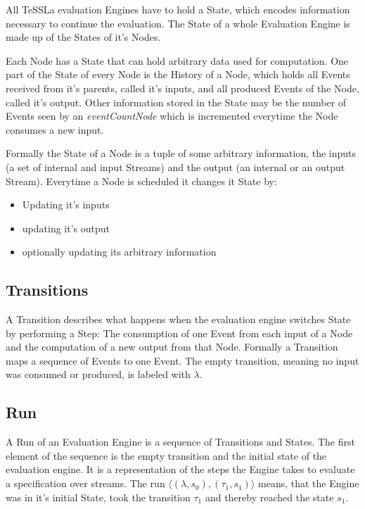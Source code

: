 All TeSSLa evaluation Engines have to hold a State, which encodes information necessary to continue the evaluation.
The State of a whole Evaluation Engine is made up of the States of it's Nodes.

Each Node has a State that can hold arbitrary data used for computation.
One part of the State of every Node is the History of a Node, which holds all Events received from it's parents, called it's inputs, and all produced Events of the Node, called it's output.
Other information stored in the State may be the number of Events seen by an \emph{eventCountNode} which is incremented everytime the Node consumes a new input.

Formally the State of a Node is a tuple of some arbitrary information, the inputs (a set of internal and input Streams) and the output (an internal or an output Stream).
Everytime a Node is scheduled it changes it State by:

\begin{itemize}
  \item Updating it's inputs
  \item updating it's output
  \item optionally updating its arbitrary information
\end{itemize}

\subsection{Transitions}
\label{sec:concepts:def:transitions}

A Transition describes what happens when the evaluation engine switches State by performing a Step:
The consumption of one Event from each input of a Node and the computation of a new output from that Node.
Formally a Transition maps a sequence of Events to one Event.
The empty transition, meaning no input was consumed or produced, is labeled with \(\lambda\).

\subsection{Run}
\label{sec:concepts:def:run}

A Run of an Evaluation Engine is a sequence of Transitions and States.
The first element of the sequence is the empty transition and the initial state of the evaluation engine.
It is a representation of the steps the Engine takes to evaluate a specification over streams.
The run \(\langle (\lambda, s_0), (\tau_1, s_1) \rangle\) means, that the Engine was in it's initial State, took the transition \(\tau_1\) and thereby reached the state \(s_1\).

